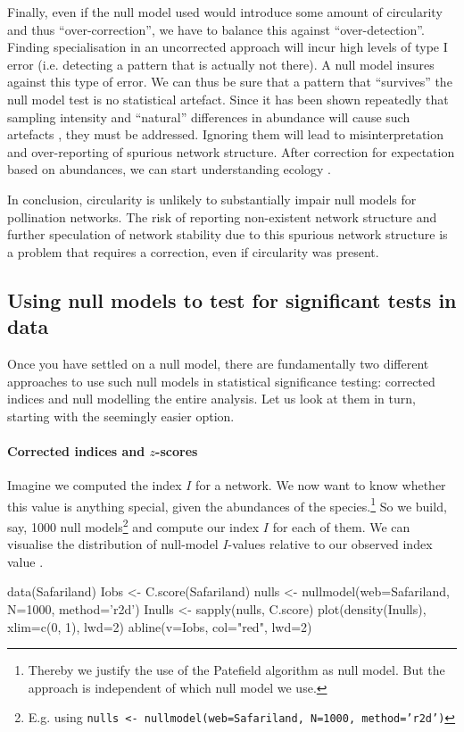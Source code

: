 \documentclass[a4paper, 11pt]{article}\usepackage[]{graphicx}\usepackage[]{color}
\begin{document}
Finally, even if the null model used would introduce some amount of circularity and thus ``over-correction'', we have to balance this against ``over-detection''. Finding specialisation in an uncorrected approach will incur high levels of type I error (i.e. detecting a pattern that is actually not there). A null model insures against this type of error. We can thus be sure that a pattern that ``survives'' the null model test is no statistical artefact. Since it has been shown repeatedly that sampling intensity and ``natural'' differences in abundance will cause such artefacts \citep{Dormann2009,Bluthgen2010,Joppa2009,Bluthgen2008}, they must be addressed. Ignoring them will lead to misinterpretation and over-reporting of spurious network structure. After correction for expectation based on abundances, we can start understanding ecology \citep{Vazquez2007}.

In conclusion, circularity is unlikely to substantially impair null models for pollination networks. The risk of reporting non-existent network structure and further speculation of network stability due to this spurious network structure is a problem that requires a correction, even if circularity was present.



\subsection{Using null models to test for significant tests in data}\label{sec:A:nullmodels}
Once you have settled on a null model, there are fundamentally two different approaches to use such null models in statistical significance testing: corrected indices and null modelling the entire analysis. Let us look at them in turn, starting with the seemingly easier option.

\paragraph{Corrected indices and $z$-scores}
Imagine we computed the index $I$ for a network. We now want to know whether this value is anything special, given the abundances of the species.\footnote{Thereby we justify the use of the Patefield algorithm as null model. But the approach is independent of which null model we use.} So we build, say, 1000 null models\footnote{E.g. using \texttt{nulls <- nullmodel(web=Safariland, N=1000, method='r2d')}} 
and compute our index $I$ for each of them. We can visualise the distribution of null-model $I$-values relative to our observed index value \citep{Dormann2009}.
\begin{Schunk}
\begin{Sinput}
data(Safariland)
Iobs <- C.score(Safariland)
nulls <- nullmodel(web=Safariland, N=1000, method='r2d')
Inulls <- sapply(nulls, C.score)
plot(density(Inulls), xlim=c(0, 1), lwd=2)
abline(v=Iobs, col="red", lwd=2)
\end{Sinput}
\end{Schunk}
\end{document}
